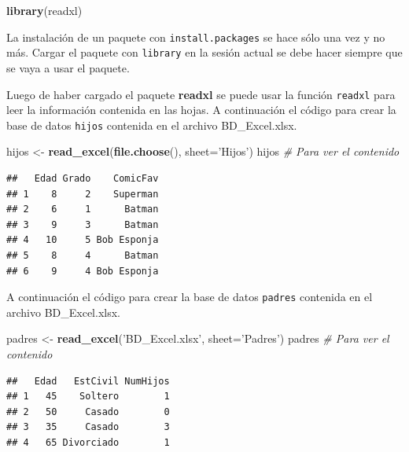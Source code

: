 \documentclass[10pt,]{krantz}
\makeatletter
\newenvironment{Shaded}{\begin{snugshade}}{\end{snugshade}}
\newcommand{\KeywordTok}[1]{\textcolor[rgb]{0.13,0.29,0.53}{\textbf{{#1}}}}
\newcommand{\DataTypeTok}[1]{\textcolor[rgb]{0.13,0.29,0.53}{{#1}}}
\newcommand{\StringTok}[1]{\textcolor[rgb]{0.31,0.60,0.02}{{#1}}}
\newcommand{\CommentTok}[1]{\textcolor[rgb]{0.56,0.35,0.01}{\textit{{#1}}}}
\newcommand{\NormalTok}[1]{{#1}}
\newenvironment{kframe}{%
\medskip{}
\setlength{\fboxsep}{.8em}
 \def\at@end@of@kframe{}%
 \ifinner\ifhmode%
  \def\at@end@of@kframe{\end{minipage}}%
  \begin{minipage}{\columnwidth}%
 \fi\fi%
 \def\FrameCommand##1{\hskip\@totalleftmargin \hskip-\fboxsep
 \colorbox{shadecolor}{##1}\hskip-\fboxsep
     \hskip-\linewidth \hskip-\@totalleftmargin \hskip\columnwidth}%
 \MakeFramed {\advance\hsize-\width
   \@totalleftmargin\z@ \linewidth\hsize
   \@setminipage}}%
 {\par\unskip\endMakeFramed%
 \at@end@of@kframe}
\renewenvironment{Shaded}{\begin{kframe}}{\end{kframe}}
\let\BeginKnitrBlock\begin \let\EndKnitrBlock\end
\makeatother
\begin{document}
\begin{Shaded}
\begin{Highlighting}[]
\KeywordTok{library}\NormalTok{(readxl)}
\end{Highlighting}
\end{Shaded}

\BeginKnitrBlock{rmdwarning}
La instalación de un paquete con \texttt{install.packages} se hace sólo
una vez y no más. Cargar el paquete con \texttt{library} en la sesión
actual se debe hacer siempre que se vaya a usar el paquete.
\EndKnitrBlock{rmdwarning}

Luego de haber cargado el paquete \textbf{readxl} se puede usar la
función \texttt{readxl} para leer la información contenida en las hojas.
A continuación el código para crear la base de datos \texttt{hijos}
contenida en el archivo BD\_Excel.xlsx.

\begin{Shaded}
\begin{Highlighting}[]
\NormalTok{hijos <-}\StringTok{ }\KeywordTok{read_excel}\NormalTok{(}\KeywordTok{file.choose}\NormalTok{(), }\DataTypeTok{sheet=}\StringTok{'Hijos'}\NormalTok{)}
\NormalTok{hijos  }\CommentTok{# Para ver el contenido}
\end{Highlighting}
\end{Shaded}

\begin{verbatim}
##   Edad Grado    ComicFav
## 1    8     2    Superman
## 2    6     1      Batman
## 3    9     3      Batman
## 4   10     5 Bob Esponja
## 5    8     4      Batman
## 6    9     4 Bob Esponja
\end{verbatim}

A continuación el código para crear la base de datos \texttt{padres}
contenida en el archivo BD\_Excel.xlsx.

\begin{Shaded}
\begin{Highlighting}[]
\NormalTok{padres <-}\StringTok{ }\KeywordTok{read_excel}\NormalTok{(}\StringTok{'BD_Excel.xlsx'}\NormalTok{, }\DataTypeTok{sheet=}\StringTok{'Padres'}\NormalTok{)}
\NormalTok{padres  }\CommentTok{# Para ver el contenido}
\end{Highlighting}
\end{Shaded}

\begin{verbatim}
##   Edad   EstCivil NumHijos
## 1   45    Soltero        1
## 2   50     Casado        0
## 3   35     Casado        3
## 4   65 Divorciado        1
\end{verbatim}
\end{document}
